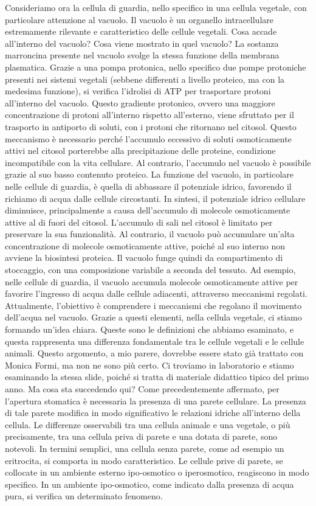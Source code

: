 \documentclass[11pt, a4paper]{article}
\begin{document}
\begin{spacing}{1}
Consideriamo ora la cellula di guardia, nello specifico in una cellula vegetale, con particolare attenzione al vacuolo. Il vacuolo è un organello intracellulare estremamente rilevante e caratteristico delle cellule vegetali. Cosa accade all'interno del vacuolo? Cosa viene mostrato in quel vacuolo? La sostanza marroncina presente nel vacuolo svolge la stessa funzione della membrana plasmatica.
Grazie a una pompa protonica, nello specifico due pompe protoniche presenti nei sistemi vegetali (sebbene differenti a livello proteico, ma con la medesima funzione), si verifica l'idrolisi di ATP per trasportare protoni all'interno del vacuolo. Questo gradiente protonico, ovvero una maggiore concentrazione di protoni all'interno rispetto all'esterno, viene sfruttato per il trasporto in antiporto di soluti, con i protoni che ritornano nel citosol. Questo meccanismo è necessario perché l'accumulo eccessivo di soluti osmoticamente attivi nel citosol porterebbe alla precipitazione delle proteine, condizione incompatibile con la vita cellulare. Al contrario, l'accumulo nel vacuolo è possibile grazie al suo basso contenuto proteico. La funzione del vacuolo, in particolare nelle cellule di guardia, è quella di abbassare il potenziale idrico, favorendo il richiamo di acqua dalle cellule circostanti.
In sintesi, il potenziale idrico cellulare diminuisce, principalmente a causa dell'accumulo di molecole osmoticamente attive al di fuori del citosol. L'accumulo di sali nel citosol è limitato per preservare la sua funzionalità. Al contrario, il vacuolo può accumulare un'alta concentrazione di molecole osmoticamente attive, poiché al suo interno non avviene la biosintesi proteica. Il vacuolo funge quindi da compartimento di stoccaggio, con una composizione variabile a seconda del tessuto. Ad esempio, nelle cellule di guardia, il vacuolo accumula molecole osmoticamente attive per favorire l'ingresso di acqua dalle cellule adiacenti, attraverso meccanismi regolati. Attualmente, l'obiettivo è comprendere i meccanismi che regolano il movimento dell'acqua nel vacuolo.
Grazie a questi elementi, nella cellula vegetale, ci stiamo formando un'idea chiara. Queste sono le definizioni che abbiamo esaminato, e questa rappresenta una differenza fondamentale tra le cellule vegetali e le cellule animali. Questo argomento, a mio parere, dovrebbe essere stato già trattato con Monica Formi, ma non ne sono più certo. Ci troviamo in laboratorio e stiamo esaminando la stessa slide, poiché si tratta di materiale didattico tipico del primo anno. Ma cosa sta succedendo qui?
Come precedentemente affermato, per l'apertura stomatica è necessaria la presenza di una parete cellulare. La presenza di tale parete modifica in modo significativo le relazioni idriche all'interno della cellula. Le differenze osservabili tra una cellula animale e una vegetale, o più precisamente, tra una cellula priva di parete e una dotata di parete, sono notevoli. In termini semplici, una cellula senza parete, come ad esempio un eritrocita, si comporta in modo caratteristico. Le cellule prive di parete, se collocate in un ambiente esterno ipo-osmotico o iperosmotico, reagiscono in modo specifico. In un ambiente ipo-osmotico, come indicato dalla presenza di acqua pura, si verifica un determinato fenomeno.

\end{spacing}
\end{document}

